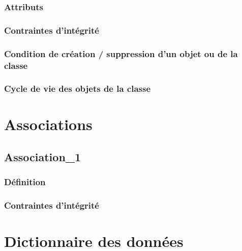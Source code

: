 \documentclass[a4paper, 11pt]{report}
\begin{document}
\subsubsection{Attributs}

\subsubsection{Contraintes d'intégrité}

\subsubsection{Condition de création / suppression d'un objet ou de la classe}

\subsubsection{Cycle de vie des objets de la classe}

\newpage
\section{Associations}

\subsection{Association\_1}

\subsubsection{Définition}

\subsubsection{Contraintes d'intégrité}

\newpage
\section{Dictionnaire des données}
\end{document}
